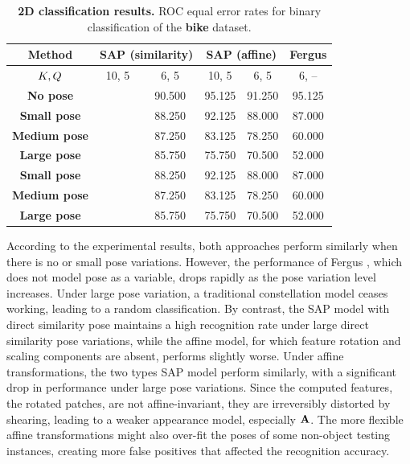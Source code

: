 \begin{table}
	\centering
	\begin{tabular}{|c|cc|cc|c|}
		\hline 
		\textbf{Method} & \multicolumn{2}{|c|}{SAP (similarity)} & \multicolumn{2}{|c|}{SAP (affine)} & Fergus \etal \cite{Fergus2007} \\  
		\hline 
		\hline 
		$K, Q$ & 10, 5 & 6, 5 & 10, 5 & 6, 5 & 6, -- \\		
		\hline 
		\textbf{No pose} 		& \textbf{\color{blue}{95.500}} & 90.500 & 95.125 & 91.250 & 95.125 \\ 
		\hline 
		\textbf{Small pose} 	& \textbf{\color{blue}{94.625}} & 88.250 & 92.125 & 88.000 & 87.000 \\ 
		\textbf{Medium pose} 	& \textbf{\color{blue}{93.250}} & 87.250 & 83.125 & 78.250 & 60.000 \\ 
		\textbf{Large pose} 	& \textbf{\color{blue}{92.250}} & 85.750 & 75.750 & 70.500 & 52.000 \\ 
		\hline
		\textbf{Small pose} 	& \textbf{\color{blue}{94.625}} & 88.250 & 92.125 & 88.000 & 87.000 \\ 
		\textbf{Medium pose} 	& \textbf{\color{blue}{93.250}} & 87.250 & 83.125 & 78.250 & 60.000 \\ 
		\textbf{Large pose} 	& \textbf{\color{blue}{92.250}} & 85.750 & 75.750 & 70.500 & 52.000 \\ 
		\hline 
	\end{tabular}
	\caption{\textbf{2D classification results.} ROC equal error rates for binary classification of the \textbf{bike} dataset.}
	\label{tab/reg/regresult2d}
\end{table}

According to the experimental results, both approaches perform similarly when there is no or small pose variations. However, the performance of Fergus \etal \cite{Fergus2007}, which does not model pose as a variable, drops rapidly as the pose variation level increases. Under large pose variation, a traditional constellation model \cite{Fergus2007} ceases working, leading to a random classification. 
By contrast, the SAP model with direct similarity pose maintains a high recognition rate under large direct similarity pose variations, while the affine model, for which feature rotation and scaling components are absent, performs slightly worse. 
Under affine transformations, the two types SAP model perform similarly, with a significant drop in performance under large pose variations. Since the computed features, \ie the rotated patches, are not affine-invariant, they are irreversibly distorted by shearing, leading to a weaker appearance model, especially $\mathbf{A}$.
The more flexible affine transformations might also over-fit the poses of some non-object testing instances, creating more false positives that affected the recognition accuracy. 

